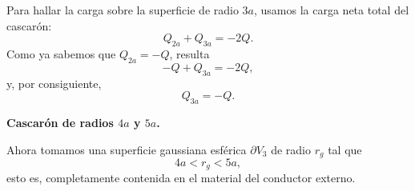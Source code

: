 \documentclass[11pt]{article}
\begin{document}
Para hallar la carga sobre la superficie de radio $3a$, usamos la carga neta total del cascarón:
\begin{equation*}
Q_{2a}+Q_{3a}=-2Q.
\end{equation*}
Como ya sabemos que $Q_{2a}=-Q$, resulta
\begin{equation*}
-Q+Q_{3a}=-2Q,
\end{equation*}
y, por consiguiente,
\begin{equation*}
\boxed{Q_{3a}=-Q.}
\end{equation*}

\textbf{Cascarón de radios $4a$ y $5a$.}

Ahora tomamos una superficie gaussiana esférica $\partial V_3$ de radio $r_g$ tal que
\begin{equation*}
4a<r_g<5a,
\end{equation*}
esto es, completamente contenida en el material del conductor externo.
\end{document}
